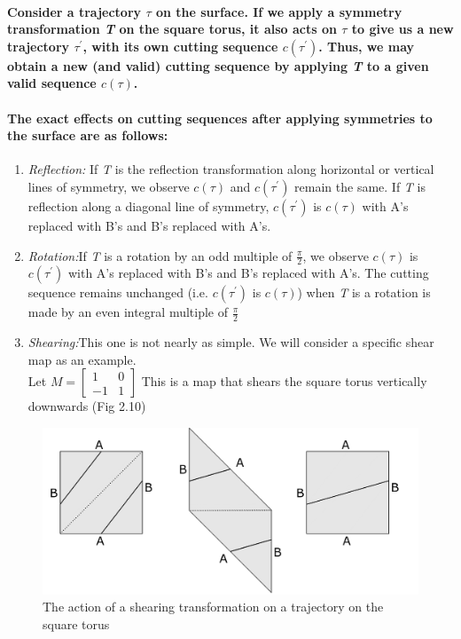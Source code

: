 \documentclass{report}
\begin{document}
\paragraph{Consider a trajectory $\tau$ on the surface. If we apply a symmetry transformation \textit{T} on the square torus, it also acts on $\tau$ to give us a new trajectory $\tau^{'}$, with its own cutting sequence $c(\tau^{'})$. Thus, we may obtain a new (and valid) cutting sequence by applying \textit{T} to a given valid sequence  $c(\tau)$.}

\paragraph{The exact effects on cutting sequences after applying symmetries to the surface are as follows:}

\begin{enumerate}
\item  {\emph{Reflection:} If \textit{T} is the reflection transformation along horizontal or vertical lines of symmetry, we observe $c(\tau)$ and $c(\tau^{'})$ remain the same. If \textit{T} is reflection along a diagonal line of symmetry, $c(\tau^{'})$ is $c(\tau)$ with A’s replaced with B’s and B’s replaced with A’s.}
\item  {\emph{Rotation:}If \textit{T} is a rotation by an odd multiple of $\frac{\pi}{2}$, we observe $c(\tau)$ is $c(\tau^{'})$ with A’s replaced with B’s and B’s replaced with A’s. The cutting sequence remains unchanged (i.e. $c(\tau^{'})$ is $c(\tau)$) when \textit{T} is a rotation is made by an even integral multiple of $\frac{\pi}{2}$}
\item  {\emph{Shearing:}This one is not nearly as simple. We will consider a specific shear map as an example. \\
Let $M = \begin{bmatrix} 1&0\\-1&1 \end{bmatrix}$ This is a map that shears the square torus vertically downwards (Fig 2.10) }
\end{enumerate}

\begin{figure} 
\begin{center}
\includegraphics[scale=0.3]{2.10}
\caption{The action of a shearing transformation on a trajectory on the square torus}
\end{center}
\end{figure}
\end{document}
